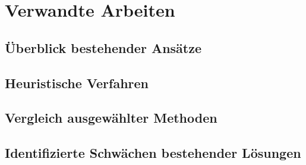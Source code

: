 \chapter{Verwandte Arbeiten} %
\label{chap:relatedwork}

\section{Überblick bestehender Ansätze}

\section{Heuristische Verfahren}

\section{Vergleich ausgewählter Methoden}

\section{Identifizierte Schwächen bestehender Lösungen}